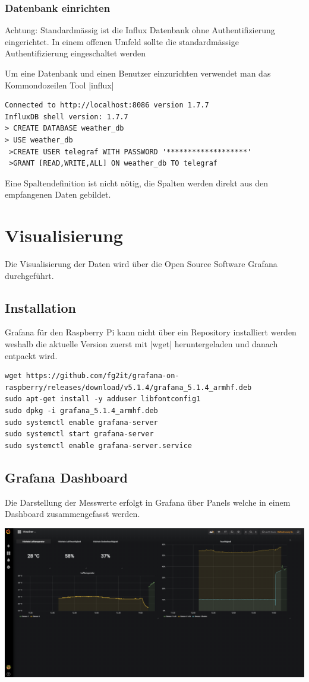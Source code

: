 \documentclass[
  12pt, %
  a4paper, %
  twoside, %
  openany, %
  numbers=noenddot, %
  BCOR=5mm, %
  parskip=half*, %
  thesis, %
]{bfhbook}
\begin{document}
   \subsubsection{Datenbank einrichten}
{\color{red}Achtung: Standardmässig ist die Influx Datenbank ohne Authentifizierung eingerichtet. In einem offenen Umfeld sollte die standardmässige Authentifizierung eingeschaltet werden \cite{influxAuth}}

Um eine Datenbank und einen Benutzer einzurichten verwendet man das Kommondozeilen Tool |influx|
 \begin{verbatim}
Connected to http://localhost:8086 version 1.7.7
InfluxDB shell version: 1.7.7
> CREATE DATABASE weather_db
> USE weather_db
 >CREATE USER telegraf WITH PASSWORD '*******************'
 >GRANT [READ,WRITE,ALL] ON weather_db TO telegraf
 \end{verbatim}
 Eine Spaltendefinition ist nicht nötig, die Spalten werden direkt aus den empfangenen Daten gebildet.
\section{Visualisierung}
Die Visualisierung der Daten wird über die Open Source Software Grafana \cite{grafana} durchgeführt.
\subsection{Installation}
Grafana für den Raspberry Pi kann nicht über ein Repository installiert werden weshalb die aktuelle Version zuerst mit |wget| heruntergeladen und danach entpackt wird.
 \begin{verbatim}
wget https://github.com/fg2it/grafana-on-raspberry/releases/download/v5.1.4/grafana_5.1.4_armhf.deb
sudo apt-get install -y adduser libfontconfig1
sudo dpkg -i grafana_5.1.4_armhf.deb
sudo systemctl enable grafana-server
sudo systemctl start grafana-server
sudo systemctl enable grafana-server.service
   \end{verbatim}
   \subsection{Grafana Dashboard}
Die Darstellung der Messwerte erfolgt in Grafana über Panels welche in einem Dashboard \cite{grafanaDashboard} zusammengefasst werden.
\begin{center}
   \includegraphics[width=17cm]{Bilder/Grafana-Dashboard.PNG}
   \captionsetup{justification=centering}
\end{center}
\end{document}
